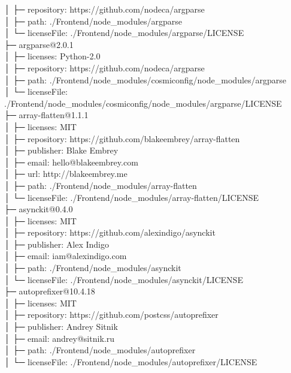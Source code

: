 \documentclass[
    paper=a4,
    twoside=false,
    parskip=half,
    listof=entryprefix,
    listof=totoc,
    index=totoc,
    bibliography=totoc,
    headsepline,
]{scrbook}
\begin{document}
    │  ├─ repository: https://github.com/nodeca/argparse\\
    │  ├─ path: ./Frontend/node\_modules/argparse\\
    │  └─ licenseFile: ./Frontend/node\_modules/argparse/LICENSE\\
    ├─ argparse@2.0.1\\
    │  ├─ licenses: Python-2.0\\
    │  ├─ repository: https://github.com/nodeca/argparse\\
    │  ├─ path: ./Frontend/node\_modules/cosmiconfig/node\_modules/argparse\\
    │  └─ licenseFile: ./Frontend/node\_modules/cosmiconfig/node\_modules/argparse/LICENSE\\
    ├─ array-flatten@1.1.1\\
    │  ├─ licenses: MIT\\
    │  ├─ repository: https://github.com/blakeembrey/array-flatten\\
    │  ├─ publisher: Blake Embrey\\
    │  ├─ email: hello@blakeembrey.com\\
    │  ├─ url: http://blakeembrey.me\\
    │  ├─ path: ./Frontend/node\_modules/array-flatten\\
    │  └─ licenseFile: ./Frontend/node\_modules/array-flatten/LICENSE\\
    ├─ asynckit@0.4.0\\
    │  ├─ licenses: MIT\\
    │  ├─ repository: https://github.com/alexindigo/asynckit\\
    │  ├─ publisher: Alex Indigo\\
    │  ├─ email: iam@alexindigo.com\\
    │  ├─ path: ./Frontend/node\_modules/asynckit\\
    │  └─ licenseFile: ./Frontend/node\_modules/asynckit/LICENSE\\
    ├─ autoprefixer@10.4.18\\
    │  ├─ licenses: MIT\\
    │  ├─ repository: https://github.com/postcss/autoprefixer\\
    │  ├─ publisher: Andrey Sitnik\\
    │  ├─ email: andrey@sitnik.ru\\
    │  ├─ path: ./Frontend/node\_modules/autoprefixer\\
    │  └─ licenseFile: ./Frontend/node\_modules/autoprefixer/LICENSE\\
\end{document}

